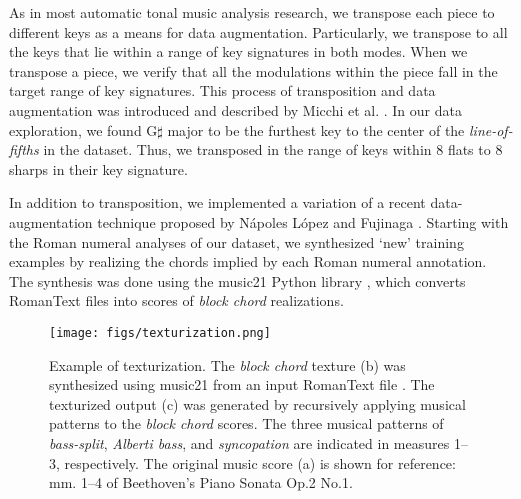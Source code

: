 

As in most automatic tonal music analysis research, we
transpose each piece to different keys as a means for data
augmentation. Particularly, we transpose to all the keys
that lie within a range of key signatures in both modes.
When we transpose a piece, we verify that all the
modulations within the piece fall in the target range of key
signatures. This process of transposition and data
augmentation was introduced and described by Micchi et al.
\parencite{micchi2020not}. In our data exploration, we found
G$\sharp$ major to be the furthest key to the center of the
\emph{line-of-fifths} \parencite{temperley2000line} in the
dataset. Thus, we transposed in the range of keys within 8
flats to 8 sharps in their key signature.


In addition to transposition, we implemented a variation of
a recent data-augmentation technique proposed by N\'apoles
L\'opez and Fujinaga \parencite{napoleslopez2020harmonic}.
Starting with the Roman numeral analyses of our dataset, we
synthesized `new' training examples by realizing the chords
implied by each Roman numeral annotation. The synthesis was
done using the music21 Python library
\parencite{cuthbert_music21_2010}, which converts RomanText
\parencite{gotham2019romantext} files into scores of \emph{block
chord} realizations.

\begin{figure}
 \centerline{\texttt{[image: figs/texturization.png]}}
 \caption{Example of texturization. The \emph{block chord}
 texture (b) was synthesized using music21
 \parencite{cuthbert_music21_2010} from an input RomanText file
 \parencite{gotham2019romantext}. The texturized output (c) was
 generated by recursively applying musical patterns to the
 \emph{block chord} scores. The three musical patterns of
 \emph{bass-split}, \emph{Alberti bass}, and
 \emph{syncopation} are indicated in measures 1--3,
 respectively. The original music score (a) is shown for
 reference: mm. 1--4 of Beethoven's Piano Sonata Op.2 No.1.}
 \label{fig:texturization}
\end{figure}

